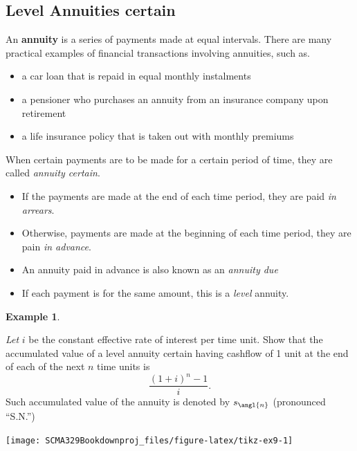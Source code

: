 \documentclass[
]{book}
\theoremstyle{definition}
\theoremstyle{definition}
\newtheorem{example}{Example}[chapter]
\theoremstyle{definition}
\theoremstyle{definition}
\theoremstyle{remark}
\begin{document}
\hypertarget{level-annuities-certain}{%
\subsection{Level Annuities certain}\label{level-annuities-certain}}

An \textbf{annuity} is a series of payments made at equal intervals. There are many practical examples of financial transactions involving annuities, such as.

\begin{itemize}
\item
  a car loan that is repaid in equal monthly instalments
\item
  a pensioner who purchases an annuity from an insurance company upon retirement
\item
  a life insurance policy that is taken out with monthly premiums
\end{itemize}

When certain payments are to be made for a certain period of time, they are called \emph{annuity certain}.

\begin{itemize}
\item
  If the payments are made at the end of each time period, they are paid \emph{in arrears}.
\item
  Otherwise, payments are made at the beginning of each time period,
  they are pain \emph{in advance}.
\item
  An annuity paid in advance is also known as an \emph{annuity due}
\item
  If each payment is for the same amount, this is a \emph{level} annuity.
\end{itemize}

\begin{example}
\protect\hypertarget{exm:unlabeled-div-25}{}\label{exm:unlabeled-div-25}

\emph{Let} \(i\) be the constant effective rate of interest per time unit. Show
that the accumulated value of a level annuity certain having cashflow of
1 unit at the end of each of the next \(n\) time units is
\[\frac{(1+i)^n -1 }{i}.\] Such accumulated value of the annuity is
denoted by \(s_\angl{n}\) (pronounced ``S.N.'')

\end{example}

\begin{center}\texttt{[image: SCMA329Bookdownproj\_files/figure-latex/tikz-ex9-1]} \end{center}
\end{document}
